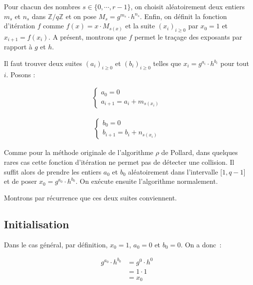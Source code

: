 		Pour chacun des nombres $s \in \{0,\cdots,r-1\}$, on choisit aléatoirement deux entiers $m_s$ et $n_s$ dans $\mathbb{Z}/q\mathbb{Z}$ et on pose $M_s = g^{m_s} \cdot h^{n_s}$. Enfin, on définit la fonction d'itération $f$ comme $f(x) = x \cdot M_{s(x)}$ et la suite $(x_i)_{i \ge 0}$ par $x_0 = 1$ et $x_{i+1} = f(x_i)$. A présent, montrons que $f$ permet le traçage des exposants par rapport à $g$ et $h$.

		Il faut trouver deux suites $(a_i)_{i \ge 0}$ et $(b_i)_{i \ge 0}$ telles que $x_i = g^{a_i} \cdot h^{b_i}$ pour tout $i$. Posons :

		\begin{align*}
      \begin{cases}
        a_0 = 0 \\
        a_{i+1} = a_i + m_{s(x_i)}
      \end{cases}
    \end{align*}

    \begin{align*}
      \begin{cases}
        b_0 = 0 \\
        b_{i+1} = b_i + n_{s(x_i)}
      \end{cases}
    \end{align*}

		Comme pour la méthode originale de l'algorithme $\rho$ de Pollard, dans quelques rares cas cette fonction d'itération ne permet pas de détecter une collision. Il suffit alors de prendre les entiers $a_0$ et $b_0$ aléatoirement dans l'intervalle $\mathopen{[}1,q-1\mathclose{]}$ et de poser $x_0 = g^{a_0} \cdot h^{b_0}$. On exécute ensuite l'algorithme normalement.

		Montrons par récurrence que ces deux suites conviennent.

		\subsection*{Initialisation}

		Dans le cas général, par définition, $x_0 = 1$, $a_0 = 0$ et $b_0 = 0$. On a donc~:

		\begin{align*}
          g^{a_0} \cdot h^{b_0} &= g^{0} \cdot h^{0} \\
                                &= 1 \cdot 1 \\
                                &= x_0
        \end{align*}

